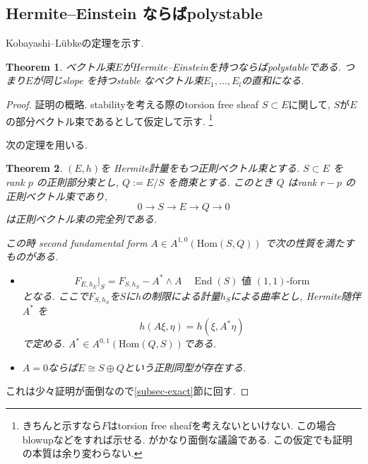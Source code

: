 \documentclass[dvipdfmx,a4paper,11pt]{article} %
\newtheorem{thm}{Theorem}[section]
\theoremstyle{definition}
\theoremstyle{remark}
\numberwithin{equation}{section}
\newcommand{\End}[0]{\operatorname{End}}
\newcommand{\Hom}[0]{\mathrm{Hom}}
\begin{document}
\subsection{Hermite--Einstein ならばpolystable}
Kobayashi--Lübkeの定理を示す.
\begin{thm}\cite[5章]{Kob14}
\label{thm-Kobayashi-Lubke}
ベクトル束$E$がHermite--Einsteinを持つならばpolystableである. つまり$E$が同じslope を持つstable なベクトル束$E_1, \ldots, E_l$の直和になる.
\end{thm}
\begin{proof}
証明の概略. 
stabilityを考える際のtorsion free sheaf $S\subset E$に関して, $S$が$E$の部分ベクトル束であるとして仮定して示す. 
\footnote{きちんと示すなら$F$はtorsion free sheafを考えないといけない. この場合blowupなどをすれば示せる. がかなり面倒な議論である. この仮定でも証明の本質は余り変わらない.}

次の定理を用いる.
\begin{thm}
$(E, h)$を Hermite計量をもつ正則ベクトル束とする. \(S\subset E\) をrank \(p\) の正則部分束とし,
\(
Q:=E/S
\)
を商束とする. このとき \(Q\) はrank \(r-p\) の正則ベクトル束であり,
\[
0\longrightarrow S\longrightarrow E\longrightarrow Q\longrightarrow 0
\]
は正則ベクトル束の完全列である.

この時 second fundamental form \(A\in A^{1,0}(\Hom(S,Q))\) で次の性質を満たすものがある. 
\begin{itemize}
\item  
\begin{equation}
\label{eq-2nd-fundamental}
F_{E, h_E}|_{S}
=F_{S, h_S}-A^{*}\wedge A
\quad 
\text{\(\End(S)\) 値 \((1,1)\)-form}
\end{equation}
となる. ここで$F_{S,h_S}$を$S$に$h$の制限による計量$h_S$による曲率とし, Hermite随伴\(A^*\) を
\[
h(A\xi,\eta)=h(\xi,A^*\eta)
\]
で定める. $A^* \in A^{0, 1}(\Hom(Q,S))$である. 
\item $A=0$ならば$E \cong S \oplus Q$という正則同型が存在する.
\end{itemize}
\end{thm}
これは少々証明が面倒なので\ref{subsec-exact}節に回す.


\end{proof}
\end{document}

